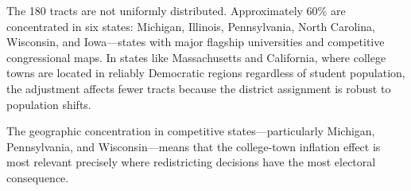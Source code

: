 The 180 tracts are not uniformly distributed. Approximately 60\% are concentrated in six states: Michigan, Illinois, Pennsylvania, North Carolina, Wisconsin, and Iowa---states with major flagship universities and competitive congressional maps. In states like Massachusetts and California, where college towns are located in reliably Democratic regions regardless of student population, the adjustment affects fewer tracts because the district assignment is robust to population shifts.

The geographic concentration in competitive states---particularly Michigan, Pennsylvania, and Wisconsin---means that the college-town inflation effect is most relevant precisely where redistricting decisions have the most electoral consequence.
